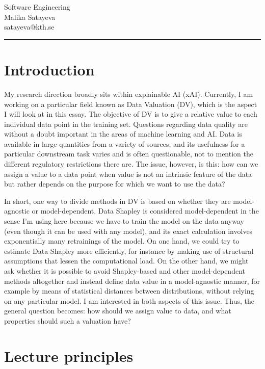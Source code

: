 \documentclass[11pt,a4paper]{article}
\begin{document}
\begin{flushright}
Software Engineering \\
Malika Satayeva \\
satayeva@kth.se
\end{flushright}
\vspace{-1em}
\noindent\rule{\textwidth}{0.4pt}

\section{Introduction}

My research direction broadly sits within explainable AI (xAI). Currently, I am working on a particular field known as Data Valuation (DV), which is the aspect I will look at in this essay. The objective of DV is to give a relative value to each individual data point in the training set. Questions regarding data quality are without a doubt important in the areas of machine learning and AI. Data is available in large quantities from a variety of sources, and its usefulness for a particular downstream task varies and is often questionable, not to mention the different regulatory restrictions there are. The issue, however, is this: how can we assign a value to a data point when value is not an intrinsic feature of the data but rather depends on the purpose for which we want to use the data?

In short, one way to divide methods in DV is based on whether they are model-agnostic or model-dependent. Data Shapley \cite{ghorbaniZ19} is considered model-dependent in the sense I'm using here because we have to train the model on the data anyway (even though it can be used with any model), and its exact calculation involves exponentially many retrainings of the model. On one hand, we could try to estimate Data Shapley more efficiently, for instance by making use of structural assumptions that lessen the computational load. On the other hand, we might ask whether it is possible to avoid Shapley-based and other model-dependent methods altogether and instead define data value in a model-agnostic manner, for example by means of statistical distances between distributions, without relying on any particular model.  I am interested in both aspects of this issue. Thus, the general question becomes: how should we assign value to data, and what properties should such a valuation have?

\section{Lecture principles} \label{sec:principles}
\end{document}
